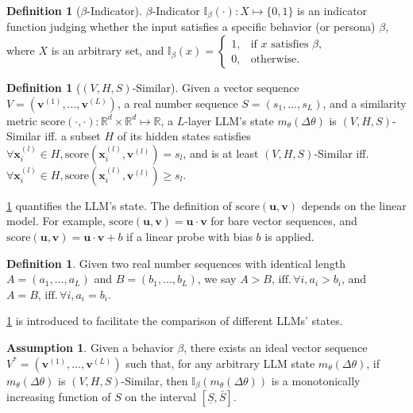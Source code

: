 \documentclass{article}
\theoremstyle{plain}
\theoremstyle{definition}
\newtheorem{definition}[theorem]{Definition}
\newtheorem{assumption}[theorem]{Assumption}
\theoremstyle{remark}
\begin{document}
\begin{definition}[$\beta$-Indicator]
	$\beta$-Indicator $\mathbb{I}_{\beta}(\cdot): X \mapsto \{0, 1\}$ is an indicator function judging whether the input satisfies a specific behavior (or persona) $\beta$, where $X$ is an arbitrary set, and  $\mathbb{I}_{\beta}(x) = \begin{cases}
		1, & \text{if } x\text{ satisfies }\beta, \\
		0, & \text{otherwise}.
	\end{cases}$
\end{definition}

\begin{definition}[$(V, H, S)$-Similar]\label{def:similar}
	Given a vector sequence $V = (\mathbf{v}^{(1)}, \dots, \mathbf{v}^{(L)})$, a real number sequence $S = (s_{1}, \dots, s_{L})$, and a similarity metric $\text{score}(\cdot, \cdot)$$:\mathbb{R}^{d} \times \mathbb{R}^{d} \mapsto \mathbb{R}$, a $L$-layer LLM's state $m_{\theta}(\Delta\theta)$ is $(V, H, S)$-Similar iff. a subset $H$ of its hidden states satisfies $\forall \mathbf{x}_{i}^{(l)} \in H, \text{score}(\mathbf{x}_{i}^{(l)}, \mathbf{v}^{(l)}) = s_{l}$, and is at least $(V, H, S)$-Similar iff. $\forall \mathbf{x}_{i}^{(l)} \in H, \text{score}(\mathbf{x}_{i}^{(l)}, \mathbf{v}^{(l)}) \ge s_{l}$.
\end{definition}

\cref{def:similar} quantifies the LLM's state. The definition of $\text{score}(\mathbf{u}, \mathbf{v})$ depends on the linear model. For example, $\text{score}(\mathbf{u}, \mathbf{v}) = \mathbf{u}\cdot\mathbf{v}$ for bare vector sequences, and $\text{score}(\mathbf{u}, \mathbf{v}) = \mathbf{u}\cdot\mathbf{v} + b$ if a linear probe with bias $b$ is applied.

\begin{definition}\label{def:seqLarge}
	Given two real number sequences with identical length $A = (a_{1}, \dots, a_{L})$ and $B = (b_{1}, \dots, b_{L})$, we say $A > B,\,\text{iff.}\,\forall i, a_{i} > b_{i}$, and $A = B,\,\text{iff.}\,\forall i, a_{i} = b_{i}$.
\end{definition}

\cref{def:seqLarge} is introduced to facilitate the comparison of different LLMs' states. 

\begin{assumption}\label{assum:control}
	Given a behavior $\beta$, there exists an ideal vector sequence $V^* = (\mathbf{v}^{(1)}, \dots, \mathbf{v}^{(L)})$ such that, for any arbitrary LLM state $m_{\theta}(\Delta\theta)$, if $m_{\theta}(\Delta\theta)$ is $(V, H, S)$-Similar, then $\mathbb{I}_{\beta}(m_{\theta}(\Delta\theta))$ is a monotonically increasing function of $S$ on the interval $[\underline{S}, \bar{S}]$.
\end{assumption}
\end{document}
